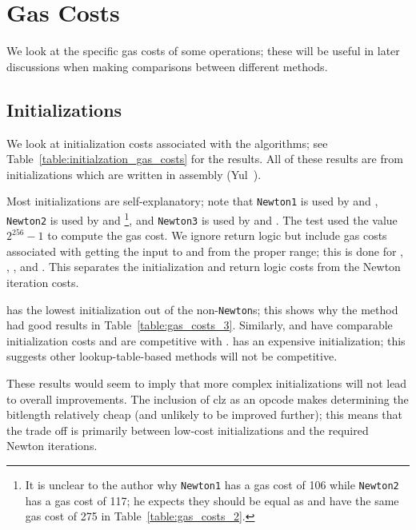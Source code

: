 \section{Gas Costs}
\label{app:gas_costs}

We look at the specific gas costs of some operations;
these will be useful in later discussions when making comparisons
between different methods.

\subsection{Initializations}
\label{app_gas_costs:initializations}

We look at initialization costs associated with the algorithms;
see Table~\ref{table:initialzation_gas_costs} for the results.
All of these results are from initializations which are written
in assembly (Yul~\cite{YulLanguage}).

Most initializations are self-explanatory;
note that \texttt{Newton1} is used by \UnrolledOne{} and \WhileOne{},
\texttt{Newton2} is used by \UnrolledTwo{} and \WhileTwo{}%
\footnote{It is unclear to the author why
\texttt{Newton1} has a gas cost of \num{106} while
\texttt{Newton2} has a gas cost of \num{117};
he expects they should be equal as
\UnrolledOne{} and \UnrolledTwo{} have the same gas cost of \num{275}
in Table~\ref{table:gas_costs_2}.},
and \texttt{Newton3} is used by \UnrolledThree{} and \WhileThree{}.
The test used the value $2^{256}-1$ to compute the gas cost.
We ignore return logic but include gas costs associated
with getting the input to and from the proper range;
this is done for \Linear{}, \HyperFour{}, \LookupFour{}, and \LookupEight{}.
This separates the initialization and return logic
costs from the Newton iteration costs.

\Linear{} has the lowest initialization out of the non-\texttt{Newton}s;
this shows why the method had good results in Table~\ref{table:gas_costs_3}.
Similarly, \HyperFour{} and \LookupFour{}
have comparable initialization costs and are competitive
with \Linear{}.
\LookupEight{} has an expensive initialization;
this suggests other lookup-table-based methods will not be competitive.

These results would seem to imply that more complex initializations will
not lead to overall improvements.
The inclusion of \textsf{clz} as an opcode makes determining
the bitlength relatively cheap (and unlikely to be improved further);
this means that the trade off is primarily between
low-cost initializations and the required Newton iterations.

